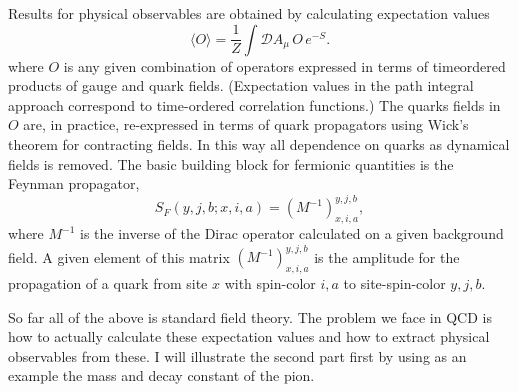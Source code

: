 Results for physical observables are obtained by calculating expectation
values
\begin{equation}
  \langle O \rangle = \frac{1}{Z} \int \mathcal{D}A_\mu\, O\, e^{-S}.
  \label{eq:expectation}
\end{equation}
where $O$ is any given combination of operators expressed in terms of timeordered products of gauge and quark fields. (Expectation values in the
path integral approach correspond to time-ordered correlation functions.)
The quarks fields in $O$ are, in practice, re-expressed in terms of quark
propagators using Wick's theorem for contracting fields. In this way all
dependence on quarks as dynamical fields is removed. The basic building
block for fermionic quantities is the Feynman propagator,
\begin{equation}
  S_F(y, j, b; x, i, a) = \left( M^{-1} \right)^{y,j,b}_{x,i,a},
  \label{eq:feynman_propagator}
\end{equation}
where $M^{-1}$ is the inverse of the Dirac operator calculated on a given background field. A given element of this matrix $\left( M^{-1} \right)^{y,j,b}_{x,i,a}$ is the amplitude for
the propagation of a quark from site $x$ with spin-color $i, a$ to site-spin-color
$y, j, b$.

So far all of the above is standard field theory. The problem we face
in QCD is how to actually calculate these expectation values and how to
extract physical observables from these. I will illustrate the second part
first by using as an example the mass and decay constant of the pion.

